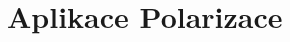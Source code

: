 \documentclass[a4paper]{article}
\numberwithin{equation}{section}
\begin{document}
    \newpage
	\section{Aplikace Polarizace}
	
\end{document}
